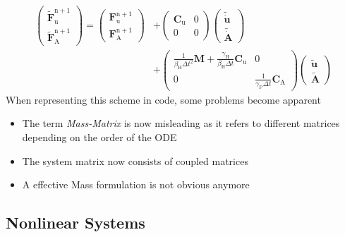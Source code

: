 \begin{equation}
\begin{aligned}
\left( \begin{array}{c} \mathbf{\tilde{F}}_{\mathrm{u}}^{\mathrm{n}+1} \\ \mathbf{\tilde{F}}_{\mathrm{A}}^{\mathrm{n}+1} \end{array} \right) = 
\left( \begin{array}{c} \mathbf{F}_{\mathrm{u}}^{\mathrm{n}+1} \\ \mathbf{F}_{\mathrm{A}}^{\mathrm{n}+1} \end{array} \right) 
&+\left( \begin{array}{cc} \mathbf{C}_{\mathrm{u}} & 0 \\ 0 & 0 \end{array} \right) 
\left( \begin{array}{c} \mathbf{\tilde{\dot{u}}} \\ \mathbf{\tilde{\dot{A}}} \end{array} \right) \\
&+\left( \begin{array}{cc} \frac{1}{\beta_\mathrm{H} \Delta t^2} \mathbf{M} + \frac{\gamma_\mathrm{H}}{\beta_\mathrm{H} \Delta t} \mathbf{C}_\mathrm{u}
& 0 \\
0 & \frac{1}{\gamma_\mathrm{P} \Delta t} \mathbf{C}_\mathrm{A}\end{array} \right)
\left( \begin{array}{c} \mathbf{\tilde{u}} \\ \mathbf{\tilde{A}} \end{array} \right)
\end{aligned}
\end{equation}
When representing this scheme in code, some problems become apparent
\begin{itemize}
\item The term {\it Mass-Matrix} is now misleading as it refers to different matrices depending on the order of the ODE
\item The system matrix now consists of coupled matrices
\item A effective Mass formulation is not obvious anymore 
\end{itemize}
\subsection{Nonlinear Systems}
